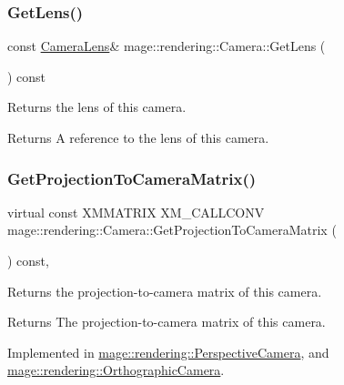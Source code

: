 \subsubsection{\texorpdfstring{Get\+Lens()}{GetLens()}\hspace{0.1cm}{\footnotesize\ttfamily [2/2]}}
{\footnotesize\ttfamily const \hyperlink{classmage_1_1rendering_1_1_camera_lens}{Camera\+Lens}\& mage\+::rendering\+::\+Camera\+::\+Get\+Lens (\begin{DoxyParamCaption}{ }\end{DoxyParamCaption}) const\hspace{0.3cm}{\ttfamily [noexcept]}}

Returns the lens of this camera.

\begin{DoxyReturn}{Returns}
A reference to the lens of this camera. 
\end{DoxyReturn}
\hypertarget{classmage_1_1rendering_1_1_camera_abb21116f8a6c7513804431d23fa4cf17}{}\label{classmage_1_1rendering_1_1_camera_abb21116f8a6c7513804431d23fa4cf17} 
\subsubsection{\texorpdfstring{Get\+Projection\+To\+Camera\+Matrix()}{GetProjectionToCameraMatrix()}}
{\footnotesize\ttfamily virtual const X\+M\+M\+A\+T\+R\+IX X\+M\+\_\+\+C\+A\+L\+L\+C\+O\+NV mage\+::rendering\+::\+Camera\+::\+Get\+Projection\+To\+Camera\+Matrix (\begin{DoxyParamCaption}{ }\end{DoxyParamCaption}) const\hspace{0.3cm}{\ttfamily [pure virtual]}, {\ttfamily [noexcept]}}

Returns the projection-\/to-\/camera matrix of this camera.

\begin{DoxyReturn}{Returns}
The projection-\/to-\/camera matrix of this camera. 
\end{DoxyReturn}


Implemented in \hyperlink{classmage_1_1rendering_1_1_perspective_camera_af049c6330ebdaa822bfd31dc88f25ac2}{mage\+::rendering\+::\+Perspective\+Camera}, and \hyperlink{classmage_1_1rendering_1_1_orthographic_camera_a7d52862a3762dcaeadf26e8ae92d9d09}{mage\+::rendering\+::\+Orthographic\+Camera}.

